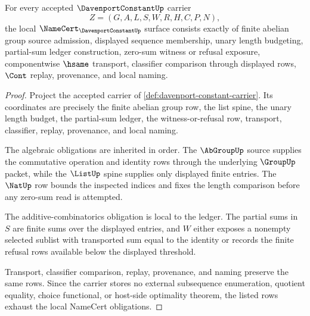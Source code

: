 \begin{theorem}
\label{thm:davenport-constant-namecert-obligations}
For every accepted $\DavenportConstantUp$ carrier
$$
Z=(G,A,L,S,W,R,H,C,P,N),
$$
the local $\NameCert_{\DavenportConstantUp}$ surface consists exactly of finite abelian group source admission, displayed sequence membership, unary length budgeting, partial-sum ledger construction, zero-sum witness or refusal exposure, componentwise $\hsame$ transport, classifier comparison through displayed rows, $\Cont$ replay, provenance, and local naming.
\end{theorem}
\begin{proof}
Project the accepted carrier of \autoref{def:davenport-constant-carrier}. Its coordinates are precisely the finite abelian group row, the list spine, the unary length budget, the partial-sum ledger, the witness-or-refusal row, transport, classifier, replay, provenance, and local naming.

The algebraic obligations are inherited in order. The $\AbGroupUp$ source supplies the commutative operation and identity rows through the underlying $\GroupUp$ packet, while the $\ListUp$ spine supplies only displayed finite entries. The $\NatUp$ row bounds the inspected indices and fixes the length comparison before any zero-sum read is attempted.

The additive-combinatorics obligation is local to the ledger. The partial sums in $S$ are finite sums over the displayed entries, and $W$ either exposes a nonempty selected sublist with transported sum equal to the identity or records the finite refusal rows available below the displayed threshold.

Transport, classifier comparison, replay, provenance, and naming preserve the same rows. Since the carrier stores no external subsequence enumeration, quotient equality, choice functional, or host-side optimality theorem, the listed rows exhaust the local NameCert obligations.
\end{proof}

